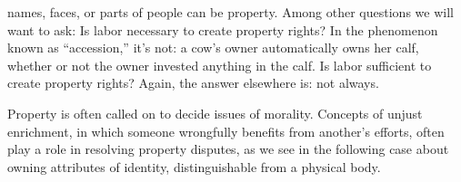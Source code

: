 names, faces, or parts of people can
be property.  Among other questions we will want to ask: Is labor necessary to
create property rights?  In the phenomenon known as ``accession,'' it's not: a
cow's owner automatically owns her calf, whether or not the owner invested
anything in the calf.  Is labor sufficient to create property rights?  Again,
the answer elsewhere is: not always.

Property is often called on to decide issues of morality.  Concepts of unjust
enrichment, in which someone wrongfully benefits from another's efforts, often
play a role in resolving property disputes, as we see in the following case
about owning attributes of identity, distinguishable from a physical body.

